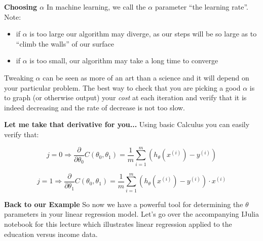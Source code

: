\documentclass[xcolor=dvipsnames]{beamer}
\begin{document}
\begin{frame}
{\bf Choosing $\alpha$}
In machine learning, we call the $\alpha$ parameter ``the learning rate''. \\
 
Note: \pause
\begin{itemize}
\item if $\alpha$ is too large our algorithm may diverge, as our steps will be so large as to ``climb the walls'' of our surface \pause
\item if $\alpha$ is too small, our algorithm may take a long time to converge
\end{itemize}
\pause
Tweaking $\alpha$ can be seen as more of an art than a science and it will depend on your particular problem. \vfill\pause
The best way to check that you are picking a good $\alpha$ is to graph (or otherwise output) your \emph{cost} at each iteration and verify that it is indeed decreasing and the rate of decrease is not too slow.\\
\end{frame}

\begin{frame}
{\bf Let me take that derivative for you...}
Using basic Calculus you can easily verify that:
\begin{framed}
\[
j = 0 \Rightarrow \frac{\partial}{\partial \theta_0}C(\theta_0,\theta_1) = \frac{1}{m}\sum\limits_{i=1}^m(h_{\theta}(x^{(i)})-y^{(i)})
\]

\[
j = 1 \Rightarrow \frac{\partial}{\partial \theta_1}C(\theta_0,\theta_1) = \frac{1}{m}\sum\limits_{i=1}^m(h_{\theta}(x^{(i)})-y^{(i)})\cdot x^{(i)}
\]
\end{framed}
\end{frame}

\begin{frame}
{\bf Back to our Example}
So now we have a powerful tool for determining the $\theta$ parameters in your linear regression model. \vfill\pause
Let's go over the accompanying IJulia notebook for this lecture which illustrates linear regression applied to the education versus income data.
\end{frame}
\end{document}
